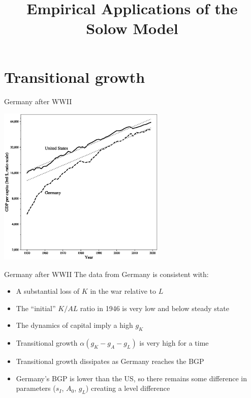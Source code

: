 

\title[Empirical application]{Empirical Applications of the Solow Model}



\maketitle

\section{Transitional growth}

\begin{frame}{Germany after WWII}
\begin{center}
\includegraphics[height = 3in]{../Figures/fig-ch3-fig1.eps}
\end{center}
\end{frame}

\begin{frame}{Germany after WWII}
The data from Germany is consistent with:
\begin{itemize}
	\item A substantial loss of $K$ in the war relative to $L$
	\item The ``initial'' $K/AL$ ratio in 1946 is very low and below steady state
	\item The dynamics of capital imply a high $g_K$
	\item Transitional growth $\alpha(g_K - g_A - g_L)$ is very high for a time
	\item Transitional growth dissipates as Germany reaches the BGP
	\item Germany's BGP is lower than the US, so there remains some difference in parameters ($s_I$, $A_0$, $g_L$) creating a level difference
\end{itemize}
\end{frame}

